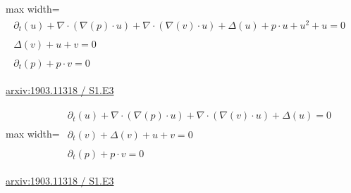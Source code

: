 \documentclass[UTF8,10pt,a4paper,fontset=mac]{ctexart}
\begin{document}
\begin{minipage}{\linewidth}\begin{center}\begin{adjustbox}{max width=\linewidth}$\displaystyle\begin{gathered}\begin{gathered}\partial_{t}(u)+\nabla\cdot(\nabla(p)\cdot u)+\nabla\cdot(\nabla(v)\cdot u)+\Delta(u)+p\cdot u+u^{2}+u=0\end{gathered}\\[5pt]\begin{gathered}\Delta(v)+u+v=0\end{gathered}\\[5pt]\begin{gathered}\partial_{t}(p)+p\cdot v=0\end{gathered}\end{gathered}$\end{adjustbox}\end{center}{\small\href{https://arxiv.org/html/1903.11318#S1.E3}{arxiv:1903.11318 / S1.E3}}\par\end{minipage}\par\vspace{6mm}

\begin{minipage}{\linewidth}\begin{center}\begin{adjustbox}{max width=\linewidth}$\displaystyle\begin{gathered}\begin{gathered}\partial_{t}(u)+\nabla\cdot(\nabla(p)\cdot u)+\nabla\cdot(\nabla(v)\cdot u)+\Delta(u)=0\end{gathered}\\[5pt]\begin{gathered}\partial_{t}(v)+\Delta(v)+u+v=0\end{gathered}\\[5pt]\begin{gathered}\partial_{t}(p)+p\cdot v=0\end{gathered}\end{gathered}$\end{adjustbox}\end{center}{\small\href{https://arxiv.org/html/1903.11318#S1.E3}{arxiv:1903.11318 / S1.E3}}\par\end{minipage}\par\vspace{6mm}
\end{document}

